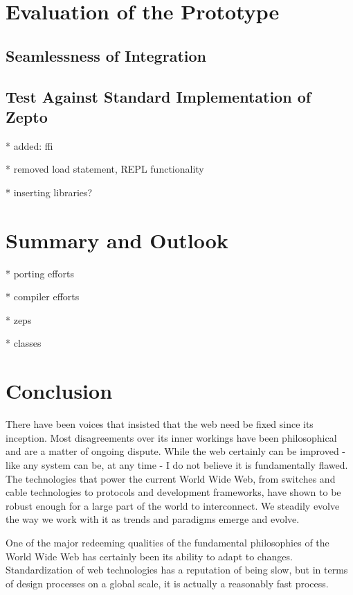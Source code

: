 \documentclass[oneside,11pt,xetex]{scrbook}
\begin{document}
\chapter{Evaluation of the Prototype}
\label{chap:evaluation}

\section{Seamlessness of Integration}

\section{Test Against Standard Implementation of Zepto}

* added: ffi

* removed load statement, REPL functionality

* inserting libraries?

\chapter{Summary and Outlook}
\label{chap:outlook}

* porting efforts

* compiler efforts

* zeps

* classes

\chapter{Conclusion}
\label{chap:conclusion}

There have been voices that insisted that the web need be fixed
since its inception. Most disagreements over its inner workings
have been philosophical and are a matter of ongoing dispute.
While the web certainly can be improved - like any system can be,
at any time - I do not believe it is fundamentally flawed. The
technologies that power the current World Wide Web, from switches
and cable technologies to protocols and development frameworks,
have shown to be robust enough for a large part of the world
to interconnect. We steadily evolve the way we work with it
as trends and paradigms emerge and evolve.

One of the major redeeming qualities of the fundamental
philosophies of the World Wide Web has certainly been
its ability to adapt to changes. Standardization of web
technologies has a reputation of being slow, but in terms
of design processes on a global scale, it is actually a
reasonably fast process.
\end{document}
